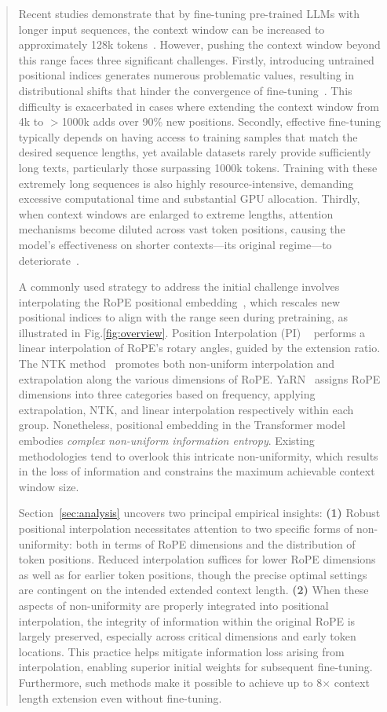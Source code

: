 \begin{abstract}
Recent studies demonstrate that by fine-tuning pre-trained LLMs with longer input sequences, the context window can be increased to approximately 128k tokens~\cite{longlora,pi,yarn,zhang2024soaring,liu2023scaling}. However, pushing the context window beyond this range faces three significant challenges. Firstly, introducing untrained positional indices generates numerous problematic values, resulting in distributional shifts that hinder the convergence of fine-tuning~\cite{pi}. This difficulty is exacerbated in cases where extending the context window from 4k to $>$1000k adds over 90\% new positions. Secondly, effective fine-tuning typically depends on having access to training samples that match the desired sequence lengths, yet available datasets rarely provide sufficiently long texts, particularly those surpassing 1000k tokens. Training with these extremely long sequences is also highly resource-intensive, demanding excessive computational time and substantial GPU allocation. Thirdly, when context windows are enlarged to extreme lengths, attention mechanisms become diluted across vast token positions, causing the model's effectiveness on shorter contexts—its original regime—to deteriorate~\cite{pi}.

A commonly used strategy to address the initial challenge involves interpolating the RoPE positional embedding~\cite{rope,pi}, which rescales new positional indices to align with the range seen during pretraining, as illustrated in Fig.\ref{fig:overview}. Position Interpolation (PI) ~\cite{pi} performs a linear interpolation of RoPE’s rotary angles, guided by the extension ratio. The NTK method~\cite{ntk,dynamicntk} promotes both non-uniform interpolation and extrapolation along the various dimensions of RoPE. YaRN~\cite{yarn} assigns RoPE dimensions into three categories based on frequency, applying extrapolation, NTK, and linear interpolation respectively within each group. Nonetheless, positional embedding in the Transformer model embodies \emph{complex non-uniform information entropy}. Existing methodologies tend to overlook this intricate non-uniformity, which results in the loss of information and constrains the maximum achievable context window size.

Section~\ref{sec:analysis} uncovers two principal empirical insights: \textbf{(1)} Robust positional interpolation necessitates attention to two specific forms of non-uniformity: both in terms of RoPE dimensions and the distribution of token positions. Reduced interpolation suffices for lower RoPE dimensions as well as for earlier token positions, though the precise optimal settings are contingent on the intended extended context length.  
\textbf{(2)} When these aspects of non-uniformity are properly integrated into positional interpolation, the integrity of information within the original RoPE is largely preserved, especially across critical dimensions and early token locations. This practice helps mitigate information loss arising from interpolation, enabling superior initial weights for subsequent fine-tuning. Furthermore, such methods make it possible to achieve up to 8$\times$ context length extension even without fine-tuning.


\end{abstract}
